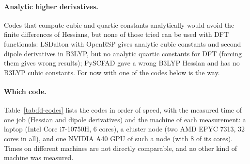 \paragraph{Analytic higher derivatives.} Codes that compute cubic and
quartic constants analytically would avoid the finite differences of
Hessians, but none of those tried can be used with DFT functionals:
LSDalton with OpenRSP gives analytic cubic constants and second dipole
derivatives in B3LYP, but no analytic quartic constants for DFT (forcing
them gives wrong results); PySCFAD gave a wrong B3LYP Hessian and has no
B3LYP cubic constants. For now  with one of the codes
below is the way.

\paragraph{Which code.} Table~\ref{tab:fd-codes} lists the codes in
order of speed, with the measured time of one job (Hessian and dipole
derivatives) and the machine of each measurement: a laptop (Intel Core
i7-10750H, 6 cores), a cluster node (two AMD EPYC 7313, 32 cores in all),
and one NVIDIA A40 GPU of such a node (with 8 of its cores). Times on
different machines are not directly comparable, and no other kind of
machine was measured.

